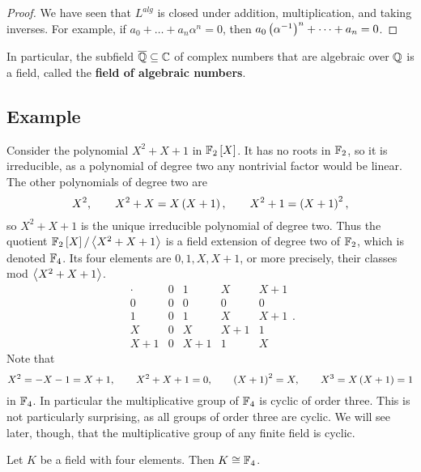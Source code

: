 \begin{proof}
We have seen that $ L^{alg} $ is closed under addition, multiplication, and taking inverses. For example, if $ a_0 + \dots + a_n\alpha^n = 0 $, then $ a_0\left( \alpha^{-1} \right)^n + \dots + a_n = 0 $.
\end{proof}

\begin{example*}
In particular, the subfield $ \overline{\mathbb{Q}} \subseteq \mathbb{C} $ of complex numbers that are algebraic over $ \mathbb{Q} $ is a field, called the \textbf{field of algebraic numbers}.
\end{example*}

\subsection{Example}

\begin{example*}
Consider the polynomial $ X^2 + X + 1 $ in $ \mathbb{F}_2\left[ X \right] $. It has no roots in $ \mathbb{F}_2 $, so it is irreducible, as a polynomial of degree two any nontrivial factor would be linear. The other polynomials of degree two are
$$ X^2, \qquad X^2 + X = X\left( X + 1 \right), \qquad X^2 + 1 = \left( X + 1 \right)^2, $$
so $ X^2 + X + 1 $ is the unique irreducible polynomial of degree two. Thus the quotient $ \mathbb{F}_2\left[ X \right] / \left\langle X^2 + X + 1 \right\rangle $ is a field extension of degree two of $ \mathbb{F}_2 $, which is denoted $ \mathbb{F}_4 $. Its four elements are $ 0, 1, X, X + 1 $, or more precisely, their classes mod $ \left\langle X^2 + X + 1 \right\rangle $.
$$
\begin{array}{c|cccc}
\cdot & 0 & 1 & X & X + 1 \\
\hline
0 & 0 & 0 & 0 & 0 \\
1 & 0 & 1 & X & X + 1 \\
X & 0 & X & X + 1 & 1 \\
X + 1 & 0 & X + 1 & 1 & X
\end{array}.
$$
Note that
$$ X^2 = -X - 1 = X + 1, \qquad X^2 + X + 1 = 0, \qquad \left( X + 1 \right)^2 = X, \qquad X^3 = X\left( X + 1 \right) = 1 $$
in $ \mathbb{F}_4 $. In particular the multiplicative group of $ \mathbb{F}_4 $ is cyclic of order three. This is not particularly surprising, as all groups of order three are cyclic. We will see later, though, that the multiplicative group of any finite field is cyclic.
\end{example*}

\begin{proposition}
Let $ K $ be a field with four elements. Then $ K \cong \mathbb{F}_4 $.
\end{proposition}

